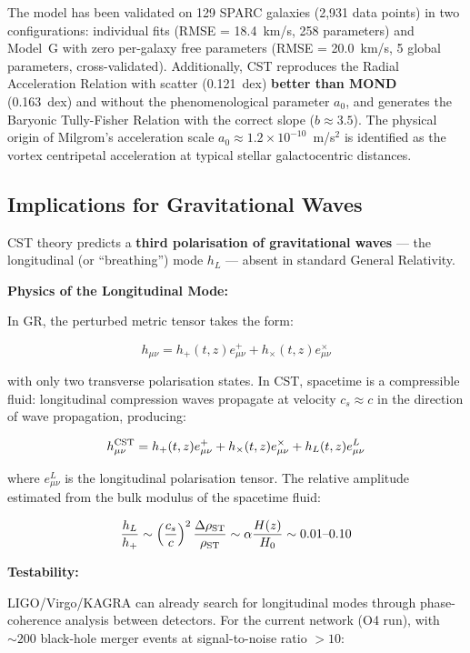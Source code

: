 \documentclass[11pt,a4paper]{article}
\begin{document}
The model has been validated on 129 SPARC galaxies (2{,}931 data points) in two configurations: individual fits (RMSE = 18.4~km/s, 258 parameters) and Model~G with zero per-galaxy free parameters (RMSE = 20.0~km/s, 5 global parameters, cross-validated). Additionally, CST reproduces the Radial Acceleration Relation with scatter (0.121~dex) \textbf{better than MOND} (0.163~dex) and without the phenomenological parameter $a_0$, and generates the Baryonic Tully-Fisher Relation with the correct slope ($b \approx 3.5$). The physical origin of Milgrom's acceleration scale $a_0 \approx 1.2 \times 10^{-10}$~m/s$^2$ is identified as the vortex centripetal acceleration at typical stellar galactocentric distances.

\hypertarget{implications-for-gravitational-waves}{%
\subsection{Implications for Gravitational
Waves}\label{implications-for-gravitational-waves}}

CST theory predicts a \textbf{third polarisation of gravitational waves}
--- the longitudinal (or ``breathing'') mode \(h_L\) --- absent in
standard General Relativity.

\textbf{Physics of the Longitudinal Mode:}

In GR, the perturbed metric tensor takes the form:

\[h_{\mu\nu} = h_+(t,z) e^+_{\mu\nu} + h_\times(t,z) e^\times_{\mu\nu}\]

with only two transverse polarisation states. In CST, spacetime is a
compressible fluid: longitudinal compression waves propagate at velocity
\(c_s \approx c\) in the direction of wave propagation, producing:

\[h_{\mu\nu}^{\rm CST} = h_+(t,z) e^+_{\mu\nu} + h_\times(t,z) e^\times_{\mu\nu} + h_L(t,z) e^L_{\mu\nu}\]

where \(e^L_{\mu\nu}\) is the longitudinal polarisation tensor. The
relative amplitude estimated from the bulk modulus of the spacetime
fluid:

\[\frac{h_L}{h_+} \sim \left(\frac{c_s}{c}\right)^2 \frac{\Delta\rho_{\rm ST}}{\rho_{\rm ST}} \sim \alpha \frac{H(z)}{H_0} \sim 0.01\text{--}0.10\]

\textbf{Testability:}

LIGO/Virgo/KAGRA can already search for longitudinal modes through
phase-coherence analysis between detectors. For the current network (O4
run), with \(\sim 200\) black-hole merger events at signal-to-noise
ratio \(> 10\):
\end{document}
